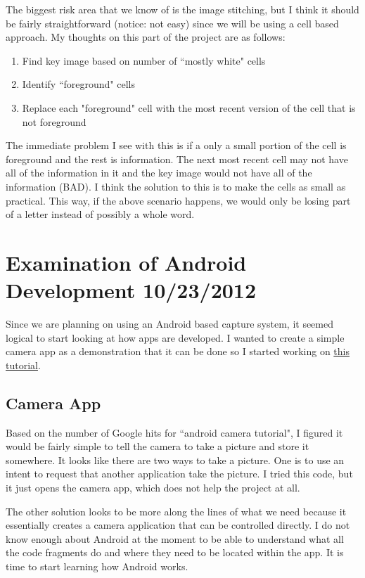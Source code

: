 \documentclass[]{article}
\begin{document}
			The biggest risk area that we know of is the image stitching, but I think it should be fairly straightforward (notice: not easy) since we will be using a cell based approach. My thoughts on this part of the project are as follows: 
			\begin{enumerate}
				\item Find key image based on number of ``mostly white" cells
				\item Identify ``foreground" cells
				\item Replace each "foreground" cell with the most recent version of the cell that is not foreground
			\end{enumerate}
			The immediate problem I see with this is if a only a small portion of the cell is foreground and the rest is information. The next most recent cell may not have all of the information in it and the key image would not have all of the information (BAD). I think the solution to this is to make the cells as small as practical. This way, if the above scenario happens, we would only be losing part of a letter instead of possibly a whole word. 
		
		
		
	
	
	\section{Examination of Android Development 10/23/2012}
		Since we are planning on using an Android based capture system, it seemed logical to start looking at how apps are developed. I wanted to create a simple camera app as a demonstration that it can be done so I started working on \href{http://developer.android.com/guide/topics/media/camera.html}{this tutorial}.
			
			\subsection{Camera App}
				Based on the number of Google hits for ``android camera tutorial", I figured it would be fairly simple to tell the camera to take a picture and store it somewhere. It looks like there are two ways to take a picture. One is to use an intent to request that another application take the picture. I tried this code, but it just opens the camera app, which does not help the project at all.
				
				The other solution looks to be more along the lines of what we need because it essentially creates a camera application that can be controlled directly. I do not know enough about Android at the moment to be able to understand what all the code fragments do and where they need to be located within the app. It is time to start learning how Android works.
				
\end{document}
